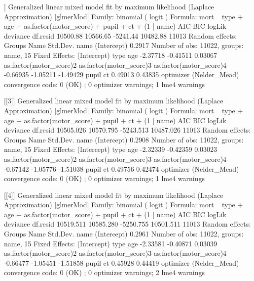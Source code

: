 \documentclass[
]{jss}
\begin{document}
\begin{CodeChunk}
\begin{CodeOutput}
[[2]]
Generalized linear mixed model fit by maximum likelihood (Laplace
  Approximation) [glmerMod]
 Family: binomial  ( logit )
Formula: mort ~ type + age + as.factor(motor_score) + pupil + ct + (1 |  
    name)
     AIC      BIC   logLik deviance df.resid 
10500.88 10566.65 -5241.44 10482.88    11013 
Random effects:
 Groups Name        Std.Dev.
 name   (Intercept) 0.2917  
Number of obs: 11022, groups:  name, 15
Fixed Effects:
            (Intercept)                     type                      age  
               -2.37718                 -0.41511                  0.03067  
as.factor(motor_score)2  as.factor(motor_score)3  as.factor(motor_score)4  
               -0.66935                 -1.05211                 -1.49429  
                  pupil                       ct  
                0.49013                  0.43835  
optimizer (Nelder_Mead) convergence code: 0 (OK) ; 0 optimizer warnings; 1 lme4 warnings 

[[3]]
Generalized linear mixed model fit by maximum likelihood (Laplace
  Approximation) [glmerMod]
 Family: binomial  ( logit )
Formula: mort ~ type + age + as.factor(motor_score) + pupil + ct + (1 |  
    name)
      AIC       BIC    logLik  deviance  df.resid 
10505.026 10570.795 -5243.513 10487.026     11013 
Random effects:
 Groups Name        Std.Dev.
 name   (Intercept) 0.2908  
Number of obs: 11022, groups:  name, 15
Fixed Effects:
            (Intercept)                     type                      age  
               -2.32339                 -0.42359                  0.03023  
as.factor(motor_score)2  as.factor(motor_score)3  as.factor(motor_score)4  
               -0.67142                 -1.05776                 -1.51038  
                  pupil                       ct  
                0.49756                  0.42474  
optimizer (Nelder_Mead) convergence code: 0 (OK) ; 0 optimizer warnings; 1 lme4 warnings 

[[4]]
Generalized linear mixed model fit by maximum likelihood (Laplace
  Approximation) [glmerMod]
 Family: binomial  ( logit )
Formula: mort ~ type + age + as.factor(motor_score) + pupil + ct + (1 |  
    name)
      AIC       BIC    logLik  deviance  df.resid 
10519.511 10585.280 -5250.755 10501.511     11013 
Random effects:
 Groups Name        Std.Dev.
 name   (Intercept) 0.2961  
Number of obs: 11022, groups:  name, 15
Fixed Effects:
            (Intercept)                     type                      age  
               -2.33581                 -0.40871                  0.03039  
as.factor(motor_score)2  as.factor(motor_score)3  as.factor(motor_score)4  
               -0.66477                 -1.05451                 -1.51858  
                  pupil                       ct  
                0.45928                  0.44419  
optimizer (Nelder_Mead) convergence code: 0 (OK) ; 0 optimizer warnings; 2 lme4 warnings 


\end{CodeOutput}
\end{CodeChunk}
\end{document}
